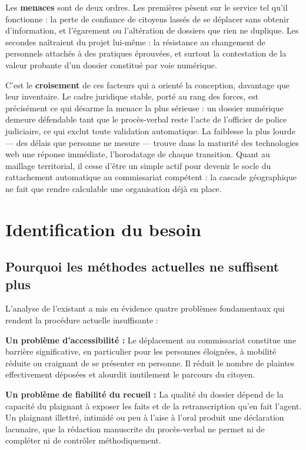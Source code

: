 Les \textbf{menaces} sont de deux ordres. Les premières pèsent sur le service tel qu'il fonctionne : la perte de confiance de citoyens lassés de se déplacer sans obtenir d'information, et l'égarement ou l'altération de dossiers que rien ne duplique. Les secondes naîtraient du projet lui-même : la résistance au changement de personnels attachés à des pratiques éprouvées, et surtout la contestation de la valeur probante d'un dossier constitué par voie numérique.

C'est le \textbf{croisement} de ces facteurs qui a orienté la conception, davantage que leur inventaire. Le cadre juridique stable, porté au rang des forces, est précisément ce qui désarme la menace la plus sérieuse : un dossier numérique demeure défendable tant que le procès-verbal reste l'acte de l'officier de police judiciaire, ce qui exclut toute validation automatique. La faiblesse la plus lourde — des délais que personne ne mesure — trouve dans la maturité des technologies web une réponse immédiate, l'horodatage de chaque transition. Quant au maillage territorial, il cesse d'être un simple actif pour devenir le socle du rattachement automatique au commissariat compétent : la cascade géographique ne fait que rendre calculable une organisation déjà en place.

\section{Identification du besoin}

\subsection{Pourquoi les méthodes actuelles ne suffisent plus}

L'analyse de l'existant a mis en évidence quatre problèmes fondamentaux qui rendent la procédure actuelle insuffisante :

\textbf{Un problème d'accessibilité :} Le déplacement au commissariat constitue une barrière significative, en particulier pour les personnes éloignées, à mobilité réduite ou craignant de se présenter en personne. Il réduit le nombre de plaintes effectivement déposées et alourdit inutilement le parcours du citoyen.

\textbf{Un problème de fiabilité du recueil :} La qualité du dossier dépend de la capacité du plaignant à exposer les faits et de la retranscription qu'en fait l'agent. Un plaignant illettré, intimidé ou peu à l'aise à l'oral produit une déclaration lacunaire, que la rédaction manuscrite du procès-verbal ne permet ni de compléter ni de contrôler méthodiquement.

